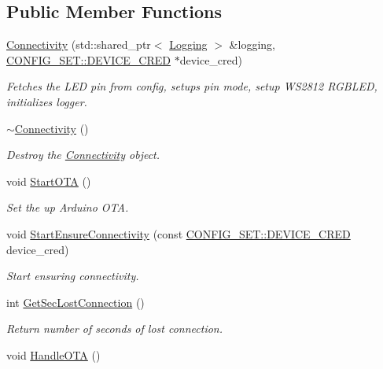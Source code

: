 \subsection*{Public Member Functions}
\begin{DoxyCompactItemize}
\item 
\hyperlink{classConnectivity_ad5b40b0c07375786dd882379e93df2fc}{Connectivity} (std\+::shared\+\_\+ptr$<$ \hyperlink{classLogging}{Logging} $>$ \&logging, \hyperlink{structCONFIG__SET_1_1DEVICE__CRED}{C\+O\+N\+F\+I\+G\+\_\+\+S\+E\+T\+::\+D\+E\+V\+I\+C\+E\+\_\+\+C\+R\+ED} $\ast$device\+\_\+cred)
\begin{DoxyCompactList}\small\item\em Fetches the L\+ED pin from config, setups pin mode, setup W\+S2812 R\+G\+B\+L\+ED, initializes logger. \end{DoxyCompactList}\item 
\hyperlink{classConnectivity_a0029e5f1650cb0152256d89595941e6a}{$\sim$\+Connectivity} ()
\begin{DoxyCompactList}\small\item\em Destroy the \hyperlink{classConnectivity}{Connectivity} object. \end{DoxyCompactList}\item 
void \hyperlink{classConnectivity_a08efeeef7c1096e4244224846f70f04c}{Start\+O\+TA} ()
\begin{DoxyCompactList}\small\item\em Set the up Arduino O\+TA. \end{DoxyCompactList}\item 
void \hyperlink{classConnectivity_a15482263a17c51293756870cdb516f81}{Start\+Ensure\+Connectivity} (const \hyperlink{structCONFIG__SET_1_1DEVICE__CRED}{C\+O\+N\+F\+I\+G\+\_\+\+S\+E\+T\+::\+D\+E\+V\+I\+C\+E\+\_\+\+C\+R\+ED} device\+\_\+cred)
\begin{DoxyCompactList}\small\item\em Start ensuring connectivity. \end{DoxyCompactList}\item 
int \hyperlink{classConnectivity_a8bf62c0db2251d2c9072986eae231673}{Get\+Sec\+Lost\+Connection} ()
\begin{DoxyCompactList}\small\item\em Return number of seconds of lost connection. \end{DoxyCompactList}\item 
void \hyperlink{classConnectivity_a29f2a5d6cbd259bcae65b7f7ba53b730}{Handle\+O\+TA} ()

\end{DoxyCompactItemize}
